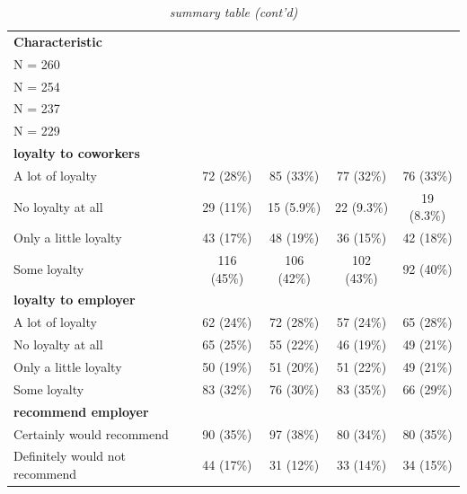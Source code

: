 \documentclass[
  11pt,
  oneside]{article}
\begin{document}
\begin{table}

\caption{\label{tab:tab-sum-wmt}\textit{summary table (cont'd)}}
\centering
\begin{tabular}[t]{l|c|c|c|c}
\hline
\textbf{Characteristic} & \makecell[c]{\textbf{ctrl}\ \ \\N = 260} & \makecell[c]{\textbf{vid0}\ \ \\N = 254} & \makecell[c]{\textbf{vidChar}\ \ \\N = 237} & \makecell[c]{\textbf{vidSolid}\ \ \\N = 229}\\
\hline
\textbf{loyalty to coworkers} &  &  &  & \\
\hline
\hspace{1em}A lot of loyalty & 72 (28\%) & 85 (33\%) & 77 (32\%) & 76 (33\%)\\
\hline
\hspace{1em}No loyalty at all & 29 (11\%) & 15 (5.9\%) & 22 (9.3\%) & 19 (8.3\%)\\
\hline
\hspace{1em}Only a little loyalty & 43 (17\%) & 48 (19\%) & 36 (15\%) & 42 (18\%)\\
\hline
\hspace{1em}Some loyalty & 116 (45\%) & 106 (42\%) & 102 (43\%) & 92 (40\%)\\
\hline
\textbf{loyalty to employer} &  &  &  & \\
\hline
\hspace{1em}A lot of loyalty & 62 (24\%) & 72 (28\%) & 57 (24\%) & 65 (28\%)\\
\hline
\hspace{1em}No loyalty at all & 65 (25\%) & 55 (22\%) & 46 (19\%) & 49 (21\%)\\
\hline
\hspace{1em}Only a little loyalty & 50 (19\%) & 51 (20\%) & 51 (22\%) & 49 (21\%)\\
\hline
\hspace{1em}Some loyalty & 83 (32\%) & 76 (30\%) & 83 (35\%) & 66 (29\%)\\
\hline
\textbf{recommend employer} &  &  &  & \\
\hline
\hspace{1em}Certainly would recommend & 90 (35\%) & 97 (38\%) & 80 (34\%) & 80 (35\%)\\
\hline
\hspace{1em}Definitely would not recommend & 44 (17\%) & 31 (12\%) & 33 (14\%) & 34 (15\%)\\

\end{tabular}
\end{table}
\end{document}
